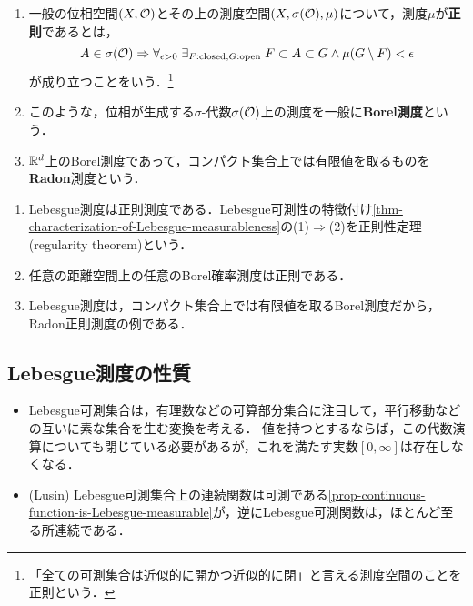 \documentclass[uplatex, dvipdfmx]{jsreport}
\begin{document}
\begin{definition}\mbox{}
    \begin{enumerate}
        \item 一般の位相空間$(X,\mathcal{O})$とその上の測度空間$(X,\sigma(\mathcal{O}),\mu)$について，測度$\mu$が\textbf{正則}であるとは，\[A\in\sigma(\mathcal{O})\Rightarrow\forall_{\epsilon>0}\;\exists_{F:\mathrm{closed},G:\mathrm{open}}\;F\subset A\subset G\land\mu(G\setminus F)<\epsilon\]が成り立つことをいう．\footnote{「全ての可測集合は近似的に開かつ近似的に閉」と言える測度空間のことを正則という．}
        \item このような，位相が生成する$\sigma$-代数$\sigma(\mathcal{O})$上の測度を一般に\textbf{Borel測度}という．
        \item $\mathbb{R}^d$上のBorel測度であって，コンパクト集合上では有限値を取るものを\textbf{Radon}測度という．
    \end{enumerate}
\end{definition}
\begin{example}\mbox{}
    \begin{enumerate}
        \item Lebesgue測度は正則測度である．Lebesgue可測性の特徴付け\ref{thm-characterization-of-Lebesgue-measurableness}の(1)$\Rightarrow$(2)を正則性定理(regularity theorem)という．
        \item 任意の距離空間上の任意のBorel確率測度は正則である．
        \item Lebesgue測度は，コンパクト集合上では有限値を取るBorel測度だから，Radon正則測度の例である．
    \end{enumerate}
\end{example}

\subsection{Lebesgue測度の性質}

\begin{tcolorbox}[colframe=ForestGreen, colback=ForestGreen!10!white,breakable,colbacktitle=ForestGreen!40!white,coltitle=black,fonttitle=\bfseries\sffamily,
title=Lebesgue非可測集合とLusinの定理]
    \begin{itemize}
        \item Lebesgue可測集合は，有理数などの可算部分集合に注目して，平行移動などの互いに素な集合を生む変換を考える．
        値を持つとするならば，この代数演算についても閉じている必要があるが，これを満たす実数$[0,\infty]$は存在しなくなる．
        \item (Lusin) Lebesgue可測集合上の連続関数は可測である\ref{prop-continuous-function-is-Lebesgue-measurable}が，逆にLebesgue可測関数は，ほとんど至る所連続である．
    \end{itemize}
\end{tcolorbox}
\end{document}
